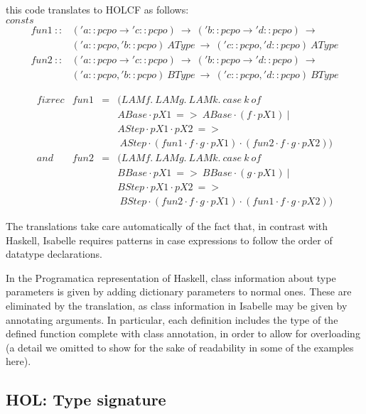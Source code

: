 \documentclass{llncs}
\begin{document}
\noindent this code translates to HOLCF as follows:\\

\noindent $consts $ 
$$ \begin{array}{ll} fun1 \ :: & ('a::pcpo \to 'c::pcpo) \ \to \ ('b::pcpo \to 'd::pcpo) \ \to \\
  & ('a::pcpo, 'b::pcpo) \ AType \ \to \ ('c::pcpo, 'd::pcpo) \ AType \\
  fun2 \ :: & ('a::pcpo \to 'c::pcpo) \ \to \ ('b::pcpo \to 
  'd::pcpo) \ \to \\ 
  & ('a::pcpo, 'b::pcpo) \ BType \ \to \ ('c::pcpo,
  'd::pcpo) \ BType 
\end{array}$$

$$\begin{array}{rccl} 
  fixrec & fun1 & = & (LAM f. \ LAM g. \ LAM k. \ case \ k \ of \\
  & & & ABase \cdot pX1 \ => \ ABase \cdot (f \cdot pX1) \ | \\
  & & & AStep \cdot pX1 \cdot pX2 \ => \\
  & & & \ AStep \cdot (fun1 \cdot f \cdot g \cdot pX1) \cdot (fun2 \cdot f \cdot g \cdot pX2)) \\
  and & fun2 & = & (LAM f. \ LAM g. \ LAM k. \ case \ k \ of \\
  & & & BBase \cdot pX1 \ => \ BBase \cdot (g \cdot pX1) \ | \\
  & & & BStep \cdot pX1 \cdot pX2 \ => \\
  & & & \ BStep \cdot (fun2 \cdot f \cdot g \cdot pX1) \cdot (fun1 \cdot f \cdot g \cdot pX2)) \end{array}$$

\noindent The translations take care automatically of the fact that,
in contrast with Haskell, Isabelle requires patterns in case
expressions to follow the order of datatype declarations.

In the Programatica representation of Haskell, class information about
type parameters is given by adding dictionary parameters to normal
ones. These are eliminated by the translation, as class information in
Isabelle may be given by annotating arguments. In particular, each
definition includes the type of the defined function complete with
class annotation, in order to allow for overloading (a detail we
omitted to show for the sake of readability in some of the examples
here).

\subsection{HOL: Type signature}
\end{document}
